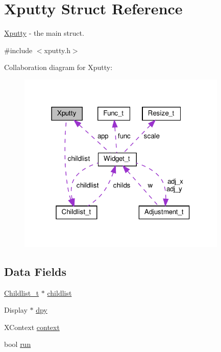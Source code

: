 \hypertarget{structXputty}{}\section{Xputty Struct Reference}
\label{structXputty}


\hyperlink{structXputty}{Xputty} -\/ the main struct.  




{\ttfamily \#include $<$xputty.\+h$>$}



Collaboration diagram for Xputty\+:
\nopagebreak
\begin{figure}[H]
\begin{center}
\leavevmode
\includegraphics[width=283pt]{structXputty__coll__graph}
\end{center}
\end{figure}
\subsection*{Data Fields}
\begin{DoxyCompactItemize}
\item 
\hyperlink{structChildlist__t}{Childlist\+\_\+t} $\ast$ \hyperlink{structXputty_a55fafc08d9702ab14137f52f35c4ff19}{childlist}
\item 
Display $\ast$ \hyperlink{structXputty_ab185ae4fd00ee1930c61e0440734878f}{dpy}
\item 
X\+Context \hyperlink{structXputty_a554049ce1c045bd3e7ce972205d7a1a2}{context}
\item 
bool \hyperlink{structXputty_a3a8e0381e77ae9fae69aab5dda8e7e7a}{run}
\end{DoxyCompactItemize}


